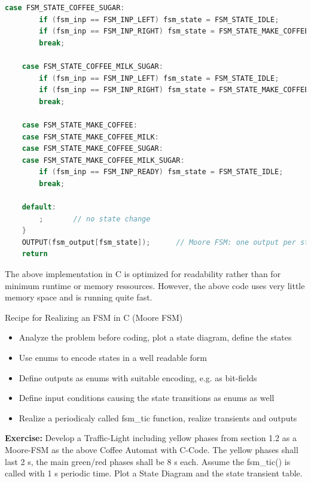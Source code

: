 \begin{lstlisting}[style=mystyle, language=c]
	case FSM_STATE_COFFEE_SUGAR:
		if (fsm_inp == FSM_INP_LEFT) fsm_state = FSM_STATE_IDLE;
		if (fsm_inp == FSM_INP_RIGHT) fsm_state = FSM_STATE_MAKE_COFFEE_SUGAR;
		break;

	case FSM_STATE_COFFEE_MILK_SUGAR:
		if (fsm_inp == FSM_INP_LEFT) fsm_state = FSM_STATE_IDLE;
		if (fsm_inp == FSM_INP_RIGHT) fsm_state = FSM_STATE_MAKE_COFFEE_MILK_SUGAR;
		break;

	case FSM_STATE_MAKE_COFFEE:
	case FSM_STATE_MAKE_COFFEE_MILK:
	case FSM_STATE_MAKE_COFFEE_SUGAR:
	case FSM_STATE_MAKE_COFFEE_MILK_SUGAR:
		if (fsm_inp == FSM_INP_READY) fsm_state = FSM_STATE_IDLE;
		break;

	default:
		;		// no state change
	}
	OUTPUT(fsm_output[fsm_state]);		// Moore FSM: one output per state
	return 
\end{lstlisting}

The above implementation in C is optimized for readability rather than for minimum runtime or memory ressources. However, the above code uses very little memory space and is running quite fast.

\begin{tcolorbox}[colback=blue!5!white,colframe=blue!75!black]
Recipe for Realizing an FSM in C  (Moore FSM)
\begin{itemize}
\item Analyze the problem before coding, plot a state diagram, define the states
\item Use enums to encode states in a well readable form
\end{itemize}
\end{tcolorbox}

\begin{itemize}
\item Define outputs as enums with suitable encoding, e.g. as bit-fields
\item Define input conditions causing the state transitions as enums as well
\item Realize a periodicaly called fsm\_tic function, realize transients and outputs
\end{itemize}

\textbf{Exercise:} Develop a Traffic-Light including yellow phases from section 1.2 as a Moore-FSM as the above Coffee Automat with C-Code. The yellow phases shall last 2 s, the main green/red phases shall be 8 s each. Assume the fsm\_tic() is called with 1 s periodic time. Plot a State Diagram and the state transient table.


